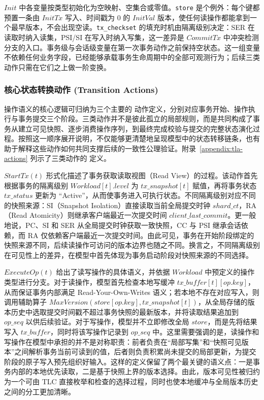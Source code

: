 $Init$ 中各变量按类型初始化为空映射、空集合或零值。\texttt{store} 是个例外：每个键都预置一条由 $InitTx$ 写入、时间戳为 $0$ 的 $InitVal$ 版本，使任何读操作都能拿到一个最早版本，不会出现空读。\texttt{tx\_checkset} 的填充时机由隔离级别决定：SER 在读取时纳入读集，PSI/SI 在写入时纳入写集，这一差异是 $CommitTx$ 中冲突检测分支的入口。事务级与会话级变量在第一次事务动作之前保持空状态。这一组变量不依赖任何业务字段，已经能够承载事务生命周期中的全部可观测行为；后续三类动作只需在它们之上做一阶变换。

\subsubsection{核心状态转换动作 (Transition Actions)}
操作语义的核心逻辑可归纳为三个主要的 \TLAPlus 动作定义，分别对应事务开始、操作执行与事务提交三个阶段。三类动作并不是彼此孤立的局部规则，而是共同构成了事务从建立可见快照、逐步消费操作序列，到最终完成校验与提交的完整状态演化过程。按照这一顺序展开说明，不仅能够更清楚地呈现模型中的状态转移链条，也有助于解释这些动作如何共同支撑后续的一致性公理验证。附录~\ref{appendix:tla-actions} 列示了三类动作的 \TLAPlus 定义。


$StartTx(t)$ 形式化描述了事务获取读取视图（Read View）的过程。该动作首先根据事务的隔离级别 $Workload[t].level$ 为 $tx\_snapshot[t]$ 赋值，再将事务状态 $tx\_status$ 更新为 ``Active''，从而使事务进入可执行状态。不同隔离级别对应不同的快照来源：SI（Snapshot Isolation）直接读取当前全局提交时钟 $shard\_ct$，RA（Read Atomicity）则继承客户端最近一次提交时间 $client\_last\_commit$。更一般地说，PC、SI 和 SER 从全局提交时钟获取一致快照，CC 与 PSI 继承会话依赖，而 RA 仅依赖客户端最近一次提交时间。由此可见，事务在开始阶段绑定的快照来源不同，后续读操作可访问的版本边界也随之不同。换言之，不同隔离级别在可见性上的差异，在模型中首先体现为事务启动阶段对快照来源的不同选择。


$ExecuteOp(t)$ 给出了读写操作的具体语义，并依据 $Workload$ 中预定义的操作类型进行分支。对于读操作，模型首先检查本地写缓冲 $tx\_buffer[t][op.key]$，从而保证事务内部满足 Read-Your-Own-Writes 语义；若本地不存在对应写入，则调用辅助算子 $MaxVersion(store[op.key], tx\_snapshot[t])$，从全局存储的版本历史中选取提交时间戳不超过事务快照的最新版本，并将读取结果追加到 $op\_seq$ 以供后续验证。对于写操作，模型并不立即修改全局 $store$，而是先将结果写入 $tx\_buffer$，同时将该写操作记录到 $op\_seq$ 中。这里需要强调的是，读操作和写操作在模型中承担的并不是对称职责：前者负责在“局部写集”和“快照可见版本”之间解析事务当前可读到的值，后者则负责积累尚未提交的局部更新，为提交阶段的原子写入预先组织好输入。这样的定义保留了两个最关键的语义点：一是事务内部的本地优先读取，二是基于快照上界的版本选择。由此，版本可见性被归约为一个可由 TLC 直接枚举和检查的选择过程，同时也使本地缓冲与全局版本历史之间的分工更加清晰。

